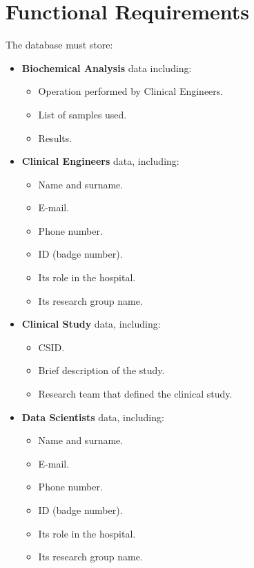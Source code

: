 \section{Functional Requirements}
The database must store:
\begin{itemize}

    \item \textbf{Biochemical Analysis} data including:
    \begin{itemize}
        \item Operation performed by Clinical Engineers.
        \item List of samples used.
        \item Results.
    \end{itemize}
    
    \item \textbf{Clinical Engineers} data, including:
    \begin{itemize}
        \item Name and surname.
        \item E-mail.
        \item Phone number.
        \item ID (badge number).
        \item Its role in the hospital. 
        \item Its research group name.
    \end{itemize}
    
    \item \textbf{Clinical Study} data, including:
    \begin{itemize}
        \item CSID.
        \item Brief description of the study.
        \item Research team that defined the clinical study.
    \end{itemize}
    
    \item \textbf{Data Scientists} data, including:
    \begin{itemize}
        \item Name and surname.
        \item E-mail.
        \item Phone number.
        \item ID (badge number).
        \item Its role in the hospital.  
        \item Its research group name.
    \end{itemize}


\end{itemize}
